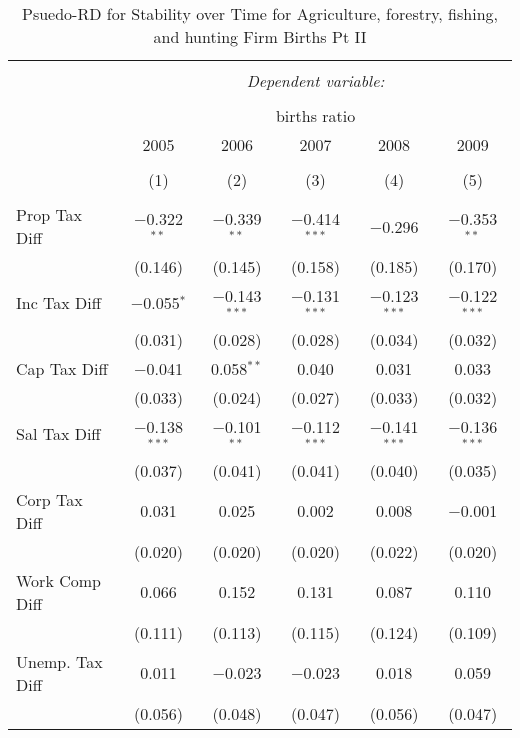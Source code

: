
\begin{table}[!htbp] \centering 
  \caption{Psuedo-RD for Stability over Time for  Agriculture, forestry, fishing, and hunting Firm Births Pt II} 
  \label{11year} 
\small 
\begin{tabular}{@{\extracolsep{5pt}}lccccc} 
\\[-1.8ex]\hline 
\hline \\[-1.8ex] 
 & \multicolumn{5}{c}{\textit{Dependent variable:}} \\ 
\cline{2-6} 
\\[-1.8ex] & \multicolumn{5}{c}{births ratio} \\ 
 & 2005 & 2006 & 2007 & 2008 & 2009 \\ 
\\[-1.8ex] & (1) & (2) & (3) & (4) & (5)\\ 
\hline \\[-1.8ex] 
 Prop Tax Diff & $-$0.322$^{**}$ & $-$0.339$^{**}$ & $-$0.414$^{***}$ & $-$0.296 & $-$0.353$^{**}$ \\ 
  & (0.146) & (0.145) & (0.158) & (0.185) & (0.170) \\ 
  Inc Tax Diff & $-$0.055$^{*}$ & $-$0.143$^{***}$ & $-$0.131$^{***}$ & $-$0.123$^{***}$ & $-$0.122$^{***}$ \\ 
  & (0.031) & (0.028) & (0.028) & (0.034) & (0.032) \\ 
  Cap Tax Diff & $-$0.041 & 0.058$^{**}$ & 0.040 & 0.031 & 0.033 \\ 
  & (0.033) & (0.024) & (0.027) & (0.033) & (0.032) \\ 
  Sal Tax Diff & $-$0.138$^{***}$ & $-$0.101$^{**}$ & $-$0.112$^{***}$ & $-$0.141$^{***}$ & $-$0.136$^{***}$ \\ 
  & (0.037) & (0.041) & (0.041) & (0.040) & (0.035) \\ 
  Corp Tax Diff & 0.031 & 0.025 & 0.002 & 0.008 & $-$0.001 \\ 
  & (0.020) & (0.020) & (0.020) & (0.022) & (0.020) \\ 
  Work Comp Diff & 0.066 & 0.152 & 0.131 & 0.087 & 0.110 \\ 
  & (0.111) & (0.113) & (0.115) & (0.124) & (0.109) \\ 
  Unemp. Tax Diff & 0.011 & $-$0.023 & $-$0.023 & 0.018 & 0.059 \\ 
  & (0.056) & (0.048) & (0.047) & (0.056) & (0.047) \\ 

\end{tabular}
\end{table}
